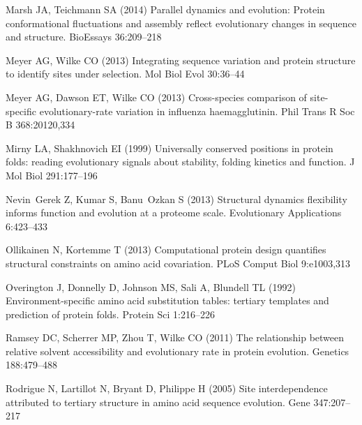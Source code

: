 \documentclass[smallextended]{svjour3}
\begin{document}
\begin{thebibliography}{59}
Marsh JA, Teichmann SA (2014) Parallel dynamics and evolution: {Protein}
  conformational fluctuations and assembly reflect evolutionary changes in
  sequence and structure. {BioEssays} 36:209--218

Meyer AG, Wilke CO (2013) Integrating sequence variation and protein structure
  to identify sites under selection. Mol Biol Evol 30:36--44

Meyer AG, Dawson ET, Wilke CO (2013) Cross-species comparison of site-specific
  evolutionary-rate variation in influenza haemagglutinin. Phil Trans R Soc B
  368:20120,334

Mirny LA, Shakhnovich EI (1999) Universally conserved positions in protein
  folds: reading evolutionary signals about stability, folding kinetics and
  function. J Mol Biol 291:177--196

Nevin~Gerek Z, Kumar S, Banu~Ozkan S (2013) Structural dynamics flexibility
  informs function and evolution at a proteome scale. Evolutionary Applications
  6:423--433

Ollikainen N, Kortemme T (2013) Computational protein design quantifies
  structural constraints on amino acid covariation. PLoS Comput Biol
  9:e1003,313

Overington J, Donnelly D, Johnson MS, Sali A, Blundell TL (1992)
  Environment-specific amino acid substitution tables: tertiary templates and
  prediction of protein folds. Protein Sci 1:216--226

Ramsey DC, Scherrer MP, Zhou T, Wilke CO (2011) The relationship between
  relative solvent accessibility and evolutionary rate in protein evolution.
  Genetics 188:479--488

Rodrigue N, Lartillot N, Bryant D, Philippe H (2005) Site interdependence
  attributed to tertiary structure in amino acid sequence evolution. Gene
  347:207--217


\end{thebibliography}
\end{document}
